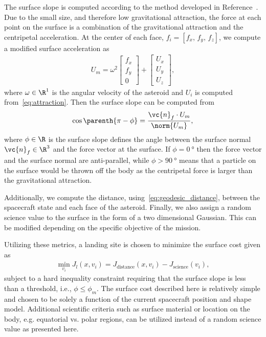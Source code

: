 \documentclass[smallextended]{svjour3}       %
\begin{document}
The surface slope is computed according to the method developed in Reference~\cite{scheeres1996}.
Due to the small size, and therefore low gravitational attraction, the force at each point on the surface is a combination of the gravitational attraction and the centripetal acceleration.
At the center of each face, \( f_i = [ f_x,\,  f_y,\,  f_z ] \), we compute a modified surface acceleration as
\begin{align}\label{eq:surface_force}
    U_m = \omega^2 \begin{bmatrix} f_x \\ f_y \\ 0 \end{bmatrix} + \begin{bmatrix} U_x \\ U_y \\ U_z \end{bmatrix},
\end{align}
where \( \omega \in \R^1 \) is the angular velocity of the asteroid and \( U_i \) is computed from~\cref{eq:attraction}.
Then the surface slope can be computed from
\begin{align}\label{eq:surface_slope}
    \cos \parenth{ \pi - \phi } = \frac{\vc{n}_f \cdot U_m}{\norm{U_m}},
\end{align}
where \( \phi \in \R \) is the surface slope defines the angle between the surface normal \( \vc{n}_f \in \R^3 \) and the force vector at the surface.
If \( \phi = \SI{0}{\degree} \) then the force vector and the surface normal are anti-parallel, while \( \phi > \SI{90}{\degree} \) means that a particle on the surface would be thrown off the body as the centripetal force is larger than the gravitational attraction.

Additionally, we compute the distance, using~\cref{eq:geodesic_distance}, between the spacecraft state and each face of the asteroid. 
Finally, we also assign a random science value to the surface in the form of a two dimensional Gaussian.
This can be modified depending on the specific objective of the mission. 

Utilizing these metrics, a landing site is chosen to minimize the surface cost given as
\begin{align}\label{eq:surface_cost}
    \min_{v_i} J_l(x, v_i) =  J_{\text{distance}}(x, v_i) - J_{\text{science}}(v_i),
\end{align}
subject to a hard inequality constraint requiring that the surface slope is less than a threshold, i.e., \( \phi \leq \phi_m \).
The surface cost described here is relatively simple and chosen to be solely a function of the current spacecraft position and shape model.
Additional scientific criteria such as surface material or location on the body, e.g. equatorial vs. polar regions, can be utilized instead of a random science value as presented here.
\end{document}
